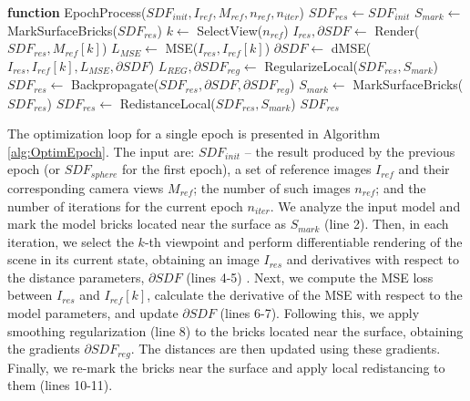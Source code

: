 \documentclass{ieeeaccess}
\begin{document}
\begin{algorithm}[htbp]
    \caption{Single epoch of SparseDR optimization.}
    \label{alg:OptimEpoch}

    \begin{algorithmic}[1]
\item[] \textbf{function} EpochProcess($SDF_{init}, I_{ref}, M_{ref}, n_{ref}, n_{iter}$)
    \STATE $SDF_{res} \leftarrow SDF_{init}$
    \STATE $S_{mark} \leftarrow $ MarkSurfaceBricks($SDF_{res}$)
        \STATE $k \leftarrow $ SelectView($n_{ref}$)
        \STATE $I_{res}, \partial SDF \leftarrow $ Render($SDF_{res}, M_{ref}[k]$)
        \STATE $L_{MSE} \leftarrow $ MSE($I_{res}, I_{ref}[k]$)
        \STATE $\partial SDF \leftarrow $ dMSE($I_{res}, I_{ref}[k], L_{MSE}, \partial SDF$)
        \STATE $L_{REG}, \partial SDF_{reg} \leftarrow $ RegularizeLocal($SDF_{res}, S_{mark}$)
        \STATE $SDF_{res} \leftarrow$ Backpropagate($SDF_{res}, \partial SDF, \partial SDF_{reg}$)
        \STATE $S_{mark} \leftarrow $ MarkSurfaceBricks($SDF_{res}$)
        \STATE $SDF_{res} \leftarrow $ RedistanceLocal($SDF_{res}, S_{mark}$)
    \ENDFOR
    \RETURN $SDF_{res}$
    \end{algorithmic}
\end{algorithm}

The optimization loop for a single epoch is presented in Algorithm \ref{alg:OptimEpoch}. The input are: $SDF_{init}$ -- the result produced by the previous epoch (or $SDF_{sphere}$ for the first epoch), a set of reference images $I_{ref}$ and their corresponding camera views $M_{ref}$; the number of such images $n_{ref}$; and the number of iterations for the current epoch $n_{iter}$. We analyze the input model and mark the model bricks located near the surface as $S_{mark}$ (line 2). Then, in each iteration, we select the $k$-th viewpoint and perform differentiable rendering of the scene in its current state, obtaining an image $I_{res}$ and derivatives with respect to the distance parameters, $\partial SDF$ (lines 4-5) . Next, we compute the MSE loss between $I_{res}$ and $I_{ref}[k]$, calculate the derivative of the MSE with respect to the model parameters, and update $\partial SDF$ (lines 6-7). Following this, we apply smoothing regularization (line 8) to the bricks located near the surface, obtaining the gradients $\partial SDF_{reg}$. The distances are then updated using these gradients. Finally, we re-mark the bricks near the surface and apply local redistancing to them (lines 10-11).
\end{document}
